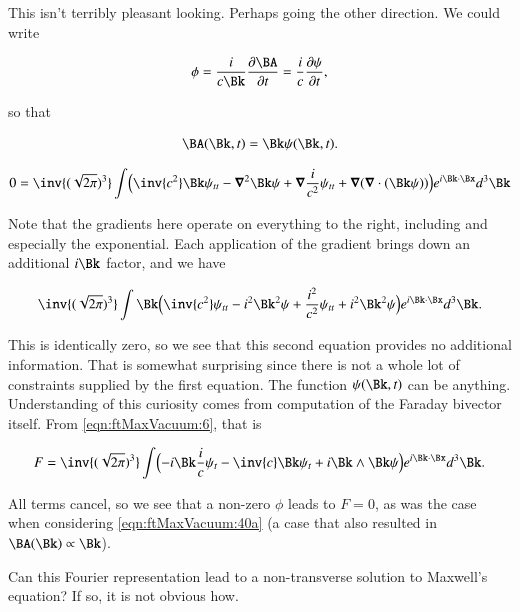 This isn't terribly pleasant looking.  Perhaps going the other direction.  We could write

\begin{align}\label{eqn:ftMaxVacuum:76}
\phi = \frac{i}{c \Bk} \PD{t}{\BA} = \frac{i}{c} \PD{t}{\psi},
\end{align}

so that

\begin{align}\label{eqn:ftMaxVacuum:77}
\BA(\Bk, t) = \Bk \psi(\Bk, t).
\end{align}

\begin{align*}
0 
&=
\inv{(\sqrt{2 \pi})^3} \int 
\Bigl(
\inv{c^2} \Bk \psi_{tt}
- \spacegrad^2 \Bk \psi 
+ \spacegrad \frac{i}{c^2} \psi_{tt}
+\spacegrad( \spacegrad \cdot (\Bk \psi) )
\Bigr)
e^{i \Bk \cdot \Bx } d^3 \Bk \\
\end{align*}

Note that the gradients here operate on everything to the right, including and especially the exponential.  Each application of the gradient brings down an additional $i\Bk$ factor, and we have

\begin{align*}
\inv{(\sqrt{2 \pi})^3} \int 
\Bk \Bigl(
\inv{c^2} \psi_{tt}
- i^2 \Bk^2 \psi 
+ \frac{i^2}{c^2} \psi_{tt}
+i^2 \Bk^2 \psi 
\Bigr)
e^{i \Bk \cdot \Bx } d^3 \Bk.
\end{align*}

This is identically zero, so we see that this second equation provides no additional information.  That is somewhat surprising since there is not a whole lot of constraints supplied by the first equation.  The function $\psi(\Bk, t)$ can be anything.  Understanding of this curiosity comes from computation of the Faraday bivector itself.  From \autoref{eqn:ftMaxVacuum:6}, that is

\begin{align}\label{eqn:ftMaxVacuum:78}
F = 
\inv{(\sqrt{2 \pi})^3} \int 
\Bigl(
-i \Bk \frac{i}{c}\psi_t - \inv{c} \Bk \psi_t + i \Bk \wedge \Bk \psi
\Bigr)
e^{i \Bk \cdot \Bx } d^3 \Bk.
\end{align}

All terms cancel, so we see that a non-zero $\phi$ leads to $F = 0$, as was the case when considering \autoref{eqn:ftMaxVacuum:40a} (a case that also resulted in $\BA(\Bk) \propto \Bk$).

Can this Fourier representation lead to a non-transverse solution to Maxwell's equation?  If so, it is not obvious how.

